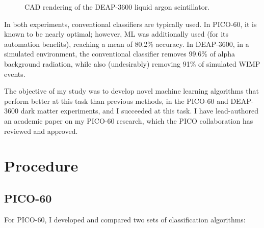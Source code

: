 \documentclass[12pt]{article}
\begin{document}
\begin{figure}
    \centering
    \caption{CAD rendering of the DEAP-3600 liquid argon scintillator.}
\end{figure}

In both experiments, conventional classifiers are typically used. In PICO-60, it is known to be nearly optimal; however, ML was additionally used (for its automation benefits), reaching a mean of 80.2\% accuracy. In DEAP-3600, in a simulated environment, the conventional classifier removes 99.6\% of alpha background radiation, while also (undesirably) removing 91\% of simulated WIMP events.

The objective of my study was to develop novel machine learning algorithms that perform better at this task than previous methods, in the PICO-60 and DEAP-3600 dark matter experiments, and I succeeded at this task. I have lead-authored an academic paper \cite{me} on my PICO-60 research, which the PICO collaboration has reviewed and approved.

\section{Procedure}

\subsection{PICO-60}

For PICO-60, I developed and compared two sets of classification algorithms:
\end{document}
